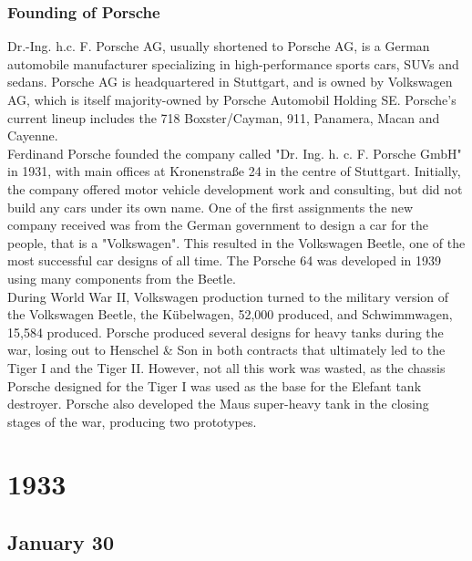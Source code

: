 \documentclass[11pt]{report}
\begin{document}
\subsection{Founding of Porsche}
Dr.-Ing. h.c. F. Porsche AG, usually shortened to Porsche AG, is a German automobile manufacturer specializing in high-performance sports cars, SUVs and sedans. Porsche AG is headquartered in Stuttgart, and is owned by Volkswagen AG, which is itself majority-owned by Porsche Automobil Holding SE. Porsche's current lineup includes the 718 Boxster/Cayman, 911, Panamera, Macan and Cayenne.\\ 
\indent Ferdinand Porsche founded the company called "Dr. Ing. h. c. F. Porsche GmbH" in 1931, with main offices at Kronenstraße 24 in the centre of Stuttgart. Initially, the company offered motor vehicle development work and consulting, but did not build any cars under its own name. One of the first assignments the new company received was from the German government to design a car for the people, that is a "Volkswagen". This resulted in the Volkswagen Beetle, one of the most successful car designs of all time. The Porsche 64 was developed in 1939 using many components from the Beetle.\\
\indent During World War II, Volkswagen production turned to the military version of the Volkswagen Beetle, the Kübelwagen, 52,000 produced, and Schwimmwagen, 15,584 produced. Porsche produced several designs for heavy tanks during the war, losing out to Henschel \& Son in both contracts that ultimately led to the Tiger I and the Tiger II. However, not all this work was wasted, as the chassis Porsche designed for the Tiger I was used as the base for the Elefant tank destroyer. Porsche also developed the Maus super-heavy tank in the closing stages of the war, producing two prototypes.

\chapter{1933}
\section{January 30}
\end{document}
